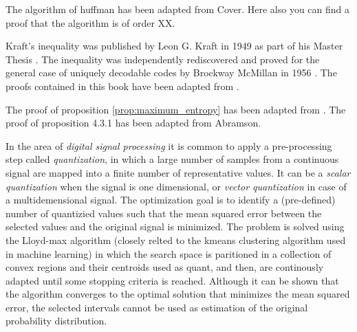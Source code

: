 The algorithm of huffman has been adapted from Cover. Here also you can find a proof that the algorithm is of order XX. 

Kraft's inequality was published by Leon G. Kraft in 1949 as part of his Master Thesis \cite{kraft1949device}. The inequality was independently rediscovered and proved for the general case of uniquely decodable codes by Brockway McMillan in 1956 \cite{mcmillan1956two}. The proofs contained in this book have been adapted from \cite{cover2012elements}.


The proof of proposition \ref{prop:maximum_entropy} has been adapted from \cite{abramson1963information}.
The proof of proposition 4.3.1 has been adapted from Abramson.

In the area of \emph{digital signal processing} \cite{gersho2012vector} it is common to apply a pre-processing step called \emph{quantization}, in which a large number of samples from a continuous signal are mapped into a finite number of representative values. It can be a \emph{scalar quantization} when the signal is one dimensional, or \emph{vector quantization} in case of a multidemensional signal. The optimization goal is to identify a (pre-defined) number of quantizied values such that the mean squared error between the selected values and the original signal is minimized. The problem is solved using the Lloyd-max algorithm \cite{lloyd1982least} (closely relted to the kmeans clustering algorithm \cite{} used in machine learning) in which the search space is paritioned in a collection of convex regions and their centroids used as quant, and then, are continously adapted until some stopping criteria is reached. Although it can be shown that the algorithm converges to the optimal solution that minimizes the mean squared error, the selected intervals cannot be used as estimation of the original probability distribution.




